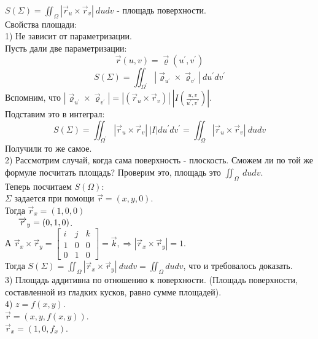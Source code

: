 \documentclass[12pt]{article}
\begin{document}
$S(\Sigma) = \iint_\Omega |\overrightarrow{r}_u \times \overrightarrow{r}_v| \ du dv$ - площадь поверхности.\\
Свойства площади:\\
1) Не зависит от параметризации.\\
Пусть дали две параметризации:\\
$$\overrightarrow{r}(u,v) = \overrightarrow{\varrho}(u^{'},v^{'})$$
$$S(\Sigma) = \iint_{\Omega^{'}} |\overrightarrow{\varrho}_{u^{'}} \times \overrightarrow{\varrho}_{v^{'}}| \ du^{'} dv^{'}$$
Вспомним, что $|\overrightarrow{\varrho}_{u^{'}} \times \overrightarrow{\varrho}_{v^{'}}| = |(\overrightarrow{r}_u \times \overrightarrow{r}_v)| \ |I(\frac{u,v}{u^{'},v^{'}})|$.\\
Подставим это в интеграл:\\
$$S(\Sigma) = \iint_{\Omega^{'}} |\overrightarrow{r}_u \times \overrightarrow{r}_v| \ |I| du^{'} dv^{'} = \iint_\Omega |\overrightarrow{r}_u \times \overrightarrow{r}_v| \ dudv$$
Получили то же самое.\\
2) Рассмотрим случай, когда сама поверхность - плоскость. Сможем ли по той же формуле посчитать площадь? Проверим это, площадь это $\iint_\Omega \ dudv$.\\
Теперь посчитаем $S(\Omega):$\\
$\Sigma$ задается при помощи $\overrightarrow{r} = (x,y,0)$.\\
Тогда $\overrightarrow{r}_x = (1,0,0)$\\
$\indent \overrightarrow{r}_y = (0,1,0)$.\\
А $\overrightarrow{r}_x \times \overrightarrow{r}_y = \begin{bmatrix} i & j & k \\ 1 & 0 & 0 \\ 0 & 1 & 0 \end{bmatrix} = \overrightarrow{k}, \Rightarrow |\overrightarrow{r}_x \times \overrightarrow{r}_y | = 1$.\\
Тогда $S(\Sigma) = \iint_\Omega |\overrightarrow{r}_x \times \overrightarrow{r}_y| \ du dv = \iint_\Omega du dv$, что и требовалось доказать.\\
3) Площадь аддитивна по отношению к поверхности. (Площадь поверхности, составленной из гладких кусков, равно сумме площадей).\\
4) $z = f(x,y)$.\\
$\overrightarrow{r} = (x,y,f(x,y))$.\\
$\overrightarrow{r}_x = (1,0,f_x)$.\\
\end{document}

